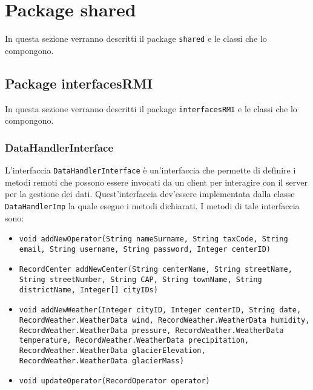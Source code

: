\section{Package shared}
In questa sezione verranno descritti il package \texttt{shared} e le classi che lo compongono.\\



\subsection{Package interfacesRMI}
In questa sezione verranno descritti il package \texttt{interfacesRMI} e le classi che lo compongono.\\

\subsubsection{DataHandlerInterface}
L'interfaccia \texttt{DataHandlerInterface} è un'interfaccia che permette di definire i metodi remoti che possono
essere invocati da un client per interagire con il server per la gestione dei dati.
Quest'interfaccia dev'essere implementata dalla classe \texttt{DataHandlerImp} la quale esegue i metodi dichiarati.
I metodi di tale interfaccia sono:
\begin{itemize}
    \item \texttt{void addNewOperator(String nameSurname, String taxCode, String email, String username, String password, Integer centerID)}
    \item \texttt{RecordCenter addNewCenter(String centerName, String streetName, String streetNumber, String CAP, String townName, String districtName, Integer[] cityIDs)}
    \item \texttt{void addNewWeather(Integer cityID, Integer centerID, String date, RecordWeather.WeatherData wind, RecordWeather.WeatherData humidity, RecordWeather.WeatherData pressure, RecordWeather.WeatherData temperature, RecordWeather.WeatherData precipitation, RecordWeather.WeatherData glacierElevation, RecordWeather.WeatherData glacierMass)}
    \item \texttt{void updateOperator(RecordOperator operator)}
\end{itemize}

